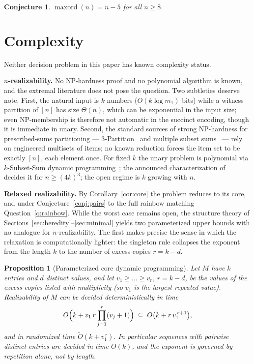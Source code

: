 \documentclass[11pt]{article}
\newtheorem{proposition}[theorem]{Proposition}
\newtheorem{conjecture}[theorem]{Conjecture}
\theoremstyle{definition}
\theoremstyle{remark}
\newcommand{\maxord}{\operatorname{maxord}}
\newcommand{\intv}[1]{[#1]}
\newcommand{\Otilde}{\widetilde{O}}
\begin{document}
\begin{conjecture}\label{conj:lower}
$\maxord(n)=n-5$ for all $n\ge8$.
\end{conjecture}

\section{Complexity}\label{sec:complexity}

Neither decision problem in this paper has known complexity status.

\textbf{$n$-realizability.} No NP-hardness proof and no polynomial algorithm is
known, and the extremal literature does not pose the question. Two subtleties
deserve note. First, the natural input is $k$ numbers ($O(k\log m_1)$ bits) while a
witness partition of $\intv n$ has size $\Theta(n)$, which can be exponential in the
input size; even NP-membership is therefore not automatic in the succinct encoding,
though it is immediate in unary. Second, the standard sources of strong NP-hardness
for prescribed-sums partitioning --- 3-Partition~\cite{GareyJohnson79} and multiple
subset sums~\cite{CapraraKP00,CieliebakEPS08} --- rely on engineered multisets of
items; no known reduction forces the item set to be exactly $\intv n$, each element
once. For fixed $k$ the unary problem is polynomial via $k$-Subset-Sum dynamic
programming~\cite{AntonopoulosPPV23}; the announced characterization
of~\cite{LladoMoragas09} decides it for $n\ge(4k)^3$; the open regime is $k$
growing with $n$.

\textbf{Relaxed realizability.} By Corollary~\ref{cor:core} the problem reduces to
its core, and under Conjecture~\ref{conj:pairs} to the full rainbow matching
Question~\ref{q:rainbow}. While the worst case remains open, the structure theory
of Sections~\ref{sec:heredity}--\ref{sec:minimal} yields two parameterized upper
bounds with no analogue for $n$-realizability. The first makes precise the sense
in which the relaxation is computationally lighter: the singleton rule collapses
the exponent from the length $k$ to the number of excess copies $r=k-d$.

\begin{proposition}[Parameterized core dynamic programming]\label{prop:coredp}
Let $M$ have $k$ entries and $d$ distinct values, and let $v_1\ge\dots\ge v_r$,
$r=k-d$, be the values of the excess copies listed with multiplicity (so $v_1$ is
the largest repeated value). Realizability of $M$ can be decided deterministically
in time
\[
O\Bigl(k+v_1\,r\prod_{j=1}^{r}(v_j+1)\Bigr)\;\subseteq\;
O\bigl(k+r\,v_1^{\,r+1}\bigr),
\]
and in randomized time $\Otilde(k+v_1^{\,r})$. In particular sequences with
pairwise distinct entries are decided in time $O(k)$, and the exponent is
governed by repetition alone, not by length.
\end{proposition}
\end{document}
